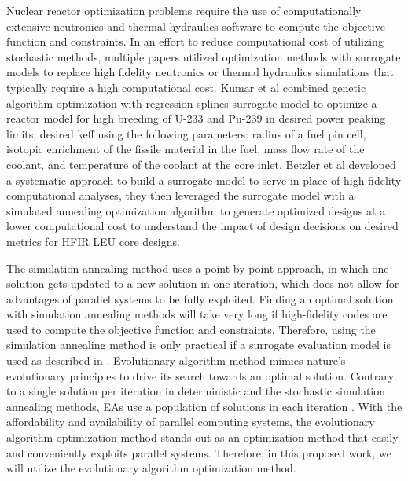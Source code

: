 Nuclear reactor optimization problems require the use of computationally 
extensive neutronics and thermal-hydraulics software to compute the objective 
function and constraints. 
In an effort to reduce computational cost of utilizing stochastic methods, 
multiple papers utilized optimization methods with surrogate models to replace 
high fidelity neutronics or thermal hydraulics simulations that typically 
require a high computational cost. 
Kumar et al \cite{kumar_new_2015} combined genetic algorithm optimization 
with regression splines surrogate model to optimize a reactor model for 
high breeding of U-233 and Pu-239 in desired power peaking limits, desired 
keff using the following parameters: radius of a fuel pin cell, isotopic enrichment 
of the fissile material in the fuel, mass flow rate of the coolant, and temperature 
of the coolant at the core inlet.
Betzler et al \cite{betzler_design_2019} developed a systematic approach to 
build a surrogate model to serve in place of high-fidelity computational 
analyses, they then leveraged the surrogate model with a simulated annealing 
optimization algorithm to generate optimized designs at a lower computational 
cost to understand the impact of design decisions on desired metrics for 
\gls{HFIR} \gls{LEU} core designs. 

The simulation annealing method uses a point-by-point approach, in which one
solution gets updated to a new solution in one iteration, which does not 
allow for advantages of parallel systems to be fully exploited. 
Finding an optimal solution with simulation annealing methods will take very 
long if high-fidelity codes are used to compute the objective function and 
constraints.
Therefore, using the simulation annealing method is only practical if a 
surrogate evaluation model is used as described in \cite{betzler_design_2019}.
Evolutionary algorithm method mimics nature's evolutionary principles to drive 
its search towards an optimal solution. 
Contrary to a single solution per iteration in deterministic and the stochastic 
simulation annealing methods, \glspl{EA} use a population of solutions in each 
iteration \cite{deb_multi-objective_2001}. 
With the affordability and availability of parallel computing systems, the 
evolutionary algorithm optimization method stands out as an optimization method 
that easily and conveniently exploits parallel systems. 
Therefore, in this proposed work, we will utilize the evolutionary algorithm 
optimization method. 

